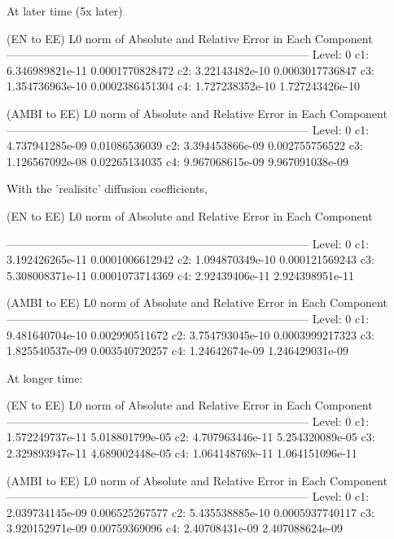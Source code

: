 \documentclass[final]{siamltex}
\begin{document}
At later time (5x later)

(EN to EE) L0 norm of Absolute and Relative Error in Each Component
--------------------------------------------------------------------------------
Level:  0
                                c1:      6.346989821e-11     0.0001770828472
                                c2:       3.22143482e-10     0.0003017736847
                                c3:      1.354736963e-10     0.0002386451304
                                c4:      1.727238352e-10     1.727243426e-10


(AMBI to EE) L0 norm of Absolute and Relative Error in Each Component
--------------------------------------------------------------------------------
Level:  0
                                c1:      4.737941285e-09       0.01086536039
                                c2:      3.394453866e-09      0.002755756522
                                c3:      1.126567092e-08       0.02265134035
                                c4:      9.967068615e-09     9.967091038e-09

With the 'realisitc' diffusion coefficients,

(EN to EE) L0 norm of Absolute and Relative Error in Each Component

--------------------------------------------------------------------------------
Level:  0
                                c1:      3.192426265e-11     0.0001006612942
                                c2:      1.094870349e-10      0.000121569243
                                c3:      5.308008371e-11     0.0001073714369
                                c4:       2.92439406e-11     2.924398951e-11


(AMBI to EE) L0 norm of Absolute and Relative Error in Each Component
--------------------------------------------------------------------------------
Level:  0
                                c1:      9.481640704e-10      0.002990511672
                                c2:      3.754793045e-10     0.0003999217323
                                c3:      1.825540537e-09      0.003540720257
                                c4:       1.24642674e-09     1.246429031e-09

At longer time:

(EN to EE) L0 norm of Absolute and Relative Error in Each Component
--------------------------------------------------------------------------------
Level:  0
                                c1:      1.572249737e-11     5.018801799e-05
                                c2:      4.707963446e-11     5.254320089e-05
                                c3:      2.329893947e-11     4.689002448e-05
                                c4:      1.064148769e-11     1.064151096e-11


(AMBI to EE) L0 norm of Absolute and Relative Error in Each Component
--------------------------------------------------------------------------------
Level:  0
                                c1:      2.039734145e-09      0.006525267577
                                c2:      5.435538885e-10     0.0005937740117
                                c3:      3.920152971e-09       0.00759369096
                                c4:       2.40708431e-09     2.407088624e-09




\end{document}
